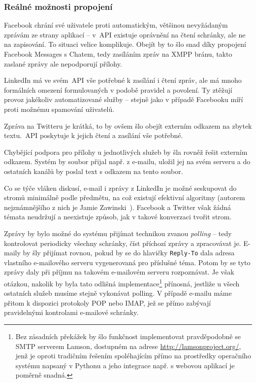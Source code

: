\documentclass[12pt,oneside,final]{fithesis2}
\begin{document}
\subsubsection*{Reálné možnosti propojení}
Facebook chrání své uživatele proti automatickým, většinou nevyžádaným zprávám ze strany aplikací -- v~API existuje oprávnění na čtení schránky, ale ne na zapisování. To situaci velice komplikuje. Obejít by to šlo snad díky propojení Facebook Messages s Chatem, tedy zasíláním zpráv na XMPP bránu, takto zaslané zprávy ale nepodporují přílohy.

LinkedIn má ve svém~API vše potřebné k zasílání i čtení zpráv, ale má mnoho formálních omezení formulovaných v podobě pravidel a povolení. Ty ztěžují provoz jakékoliv automatizované služby -- stejně jako v případě Facebooku míří proti možnému spamování uživatelů.

Zpráva na Twitteru je krátká, to by ovšem šlo obejít externím odkazem na zbytek textu.~API poskytuje k jejich čtení a zasílání vše potřebné.

Chybějící podpora pro přílohy u jednotlivých služeb by šla rovněž řešit externím odkazem. Systém by soubor přijal např. z e-mailu, uložil jej na svém serveru a do ostatních kanálů by poslal text s odkazem na tento soubor.

Co se týče vláken diskusí, e-mail i zprávy z LinkedIn je možné seskupovat do stromů minimálně podle předmětu, na což existují efektivní algoritmy (autorem nejznámnějšího z nich je Jamie Zawinski~\cite{zawinski2002message}). Facebook a Twitter však žádná témata neudržují a neexistuje způsob, jak v takové konverzaci tvořit strom.

Zprávy by bylo možné do systému přijímat technikou zvanou \emph{polling} -- tedy kontrolovat periodicky všechny schránky, číst příchozí zprávy a zpracovávat je. E-maily by šly přijímat rovnou, pokud by se do hlavičky {\tt Reply-To} dala adresa vlastního e-mailového serveru vygenerovaná pro příslušné téma. Potom by se tyto zprávy daly při příjmu na takovém e-mailovém serveru rozpoznávat. Je však otázkou, nakolik by byla tato odlišná implementace\footnote{Bez zásadních překážek by šlo funkčnost implementovat pravděpodobně se SMTP serverem Lamson, dostupném na adrese \url{http://lamsonproject.org/}, jenž je oproti tradičním řešením spoléhajícím přímo na prostředky operačního systému napsaný v Pythonu a jeho integrace např. s webovou aplikací je poměrně snadná.} přínosná, jestliže u všech ostatních služeb musíme stejně vykonávat polling. V případě e-mailu máme přitom k dispozici protokoly POP nebo IMAP, jež se přímo zabývají pravidelnými kontrolami e-mailové schránky.
\end{document}
